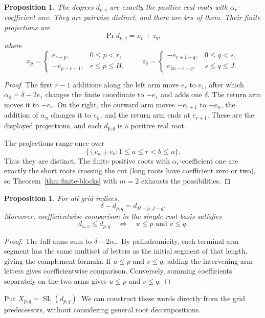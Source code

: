 \documentclass[11pt]{amsart}
\numberwithin{equation}{section}
\newtheorem{proposition}[theorem]{Proposition}
\theoremstyle{definition}
\DeclareMathOperator{\SL}{SL}
\DeclareMathOperator{\Prj}{Pr}
\begin{document}
\begin{proposition}\label{prop:grid-roots}
The degrees $d_{p,q}$ are exactly the positive real roots with $\alpha_r$-coefficient one. They are pairwise distinct, and there are $4rs$ of them. Their finite projections are
\[
 \Prj d_{p,q}=x_p+z_q,
\]
where
\[
 x_p=\begin{cases}
 e_{r-p},&0\leq p<r,\\
 -e_{p-r+1},&r\leq p\leq H,
 \end{cases}
 \qquad
 z_q=\begin{cases}
 -e_{r+1+q},&0\leq q<s,\\
 e_{2n-r-q},&s\leq q\leq J.
 \end{cases}
\]
\end{proposition}
\begin{proof}
The first $r-1$ additions along the left arm move $e_r$ to $e_1$, after which $\alpha_0=\delta-2e_1$ changes the finite coordinate to $-e_1$ and adds one $\delta$. The return arm moves it to $-e_r$. On the right, the outward arm moves $-e_{r+1}$ to $-e_n$, the addition of $\alpha_n$ changes it to $e_n$, and the return arm ends at $e_{r+1}$. These are the displayed projections, and each $d_{p,q}$ is a positive real root.

The projections range once over
\[
 \{\pm e_a\pm e_b:1\leq a\leq r<b\leq n\}.
\]
Thus they are distinct. The finite positive roots with $\alpha_r$-coefficient one are exactly the short roots crossing the cut (long roots have coefficient zero or two), so Theorem~\ref{thm:finite-blocks} with $m=2$ exhausts the possibilities.
\end{proof}

\begin{proposition}\label{prop:grid-complement}
For all grid indices,
\[
 \delta-d_{p,q}=d_{H-p,J-q}.
\]
Moreover, coefficientwise comparison in the simple-root basis satisfies
\[
 d_{u,v}\leq d_{p,q}\quad\Longleftrightarrow\quad u\leq p\text{ and }v\leq q.
\]
\end{proposition}
\begin{proof}
The full arms sum to $\delta-2\alpha_r$. By palindromicity, each terminal arm segment has the same multiset of letters as the initial segment of that length, giving the complement formula. If $u\leq p$ and $v\leq q$, adding the intervening arm letters gives coefficientwise comparison. Conversely, summing coefficients separately on the two arms gives $u\leq p$ and $v\leq q$.
\end{proof}

Put $X_{p,q}=\SL(d_{p,q})$. We can construct these words directly from the grid predecessors, without considering general root decompositions.
\end{document}

